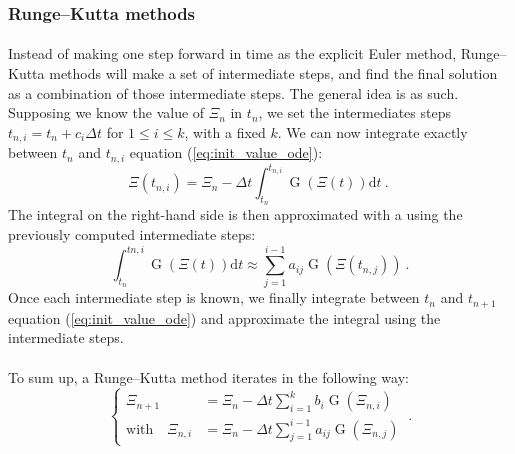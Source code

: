       \subsubsection{Runge--Kutta methods}

        \paragraph{}
        Instead of making one step forward in time as the explicit Euler method, Runge--Kutta methods will make a set of intermediate steps, and find the final solution as a combination of those intermediate steps.
        The general idea is as such.
        Supposing we know the value of $\Xi_n$ in $t_n$, we set the intermediates steps $t_{n, i} = t_n + c_i\Delta t$ for $1 \leq i \leq k$, with a fixed $k$.
        We can now integrate exactly between $t_n$ and $t_{n, i}$ equation (\ref{eq:init_value_ode}):
        \begin{equation}
          \Xi\left(t_{n, i}\right) = \Xi_n - \Delta t \int_{t_n}^{t_{n,i}} \operatorname{G}\left(\Xi\left(t\right)\right) \mathrm{d}t\ .\
        \end{equation}
        The integral on the right-hand side is then approximated with a  using the previously computed intermediate steps:
        \begin{equation}
          \int_{t_n}^{t{n,i}} \operatorname{G}\left(\Xi\left(t\right)\right) \mathrm{d}t \approx \sum_{j = 1}^{i-1} a_{ij} \operatorname{G}\left(\Xi\left(t_{n,j}\right)\right) \ .
        \end{equation}
        Once each intermediate step is known, we finally integrate between $t_n$ and $t_{n+1}$ equation (\ref{eq:init_value_ode}) and approximate the integral using the intermediate steps.

        \paragraph{}
        To sum up, a Runge--Kutta method iterates in the following way:
        \begin{equation}
          \left\{\begin{aligned}
            \Xi_{n+1} &= \Xi_n - \Delta t \sum_{i = 1}^k b_i \operatorname{G}\left(\Xi_{n,i}\right) \\
            \textrm{with}\quad \Xi_{n,i} &= \Xi_n - \Delta t \sum_{j = 1}^{i-1} a_{ij} \operatorname{G}\left(\Xi_{n,j}\right)
          \end{aligned}\right. \ .
        \end{equation}

